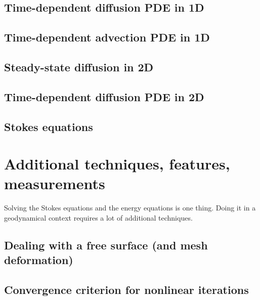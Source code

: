 \documentclass[a4paper]{article}
\begin{document}
\subsection{Time-dependent diffusion PDE in 1D} 

\newpage
\subsection{Time-dependent advection PDE in 1D \label{ss:dgfem1D_adv}}  %

\newpage
\subsection{Steady-state diffusion in 2D} 
\subsection{Time-dependent diffusion PDE in 2D}

\newpage
\subsection{Stokes equations} 



\newpage
\section{Additional techniques, features, measurements} %

Solving the Stokes equations and the energy equations is one thing. Doing it in 
a geodynamical context requires a lot of additional techniques. 

\newpage %
\subsection{Dealing with a free surface (and mesh deformation)}\label{sec:freesurface}  
\newpage %
\subsection{Convergence criterion for nonlinear iterations\label{sec:nlconvcrit}} 
\newpage %
\end{document}
